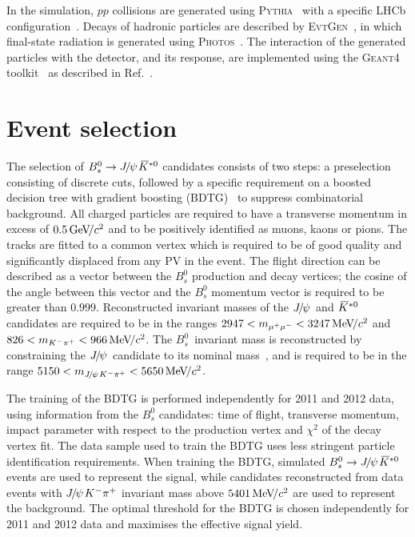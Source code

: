 \documentclass[12pt,a4paper]{article}
\def\photos     {\mbox{\textsc{Photos}}\xspace}
\def\pythia     {\mbox{\textsc{Pythia}}\xspace}
\def\evtgen     {\mbox{\textsc{EvtGen}}\xspace}
\def\geant      {\mbox{\textsc{Geant4}}\xspace}
\def\PJ      {\ensuremath{J}\xspace}
\def\lhcb {\mbox{LHCb}\xspace}
\def\Ppsi {\ensuremath{\psi}\xspace}
\def\jpsi     {{\ensuremath{{\PJ\mskip -3mu/\mskip -2mu\Ppsi\mskip 2mu}}}\xspace}
\def\Jpsi     {{\ensuremath{\jpsi}}\xspace}
\newcommand{\Bs}{\ensuremath{B^0_s}\xspace}
\newcommand{\BsJpsiKst}{\ensuremath{B^0_s\to \jpsi \Kstarzb}\xspace}
\def\Kbar  {\kern 0.2em\overline{\kern -0.2em K}{}\xspace}
\def\Kstarzb {\ensuremath{\Kbar^{*0}}\xspace}
\newcommand{\gevcc}{\ensuremath{{\mathrm{\,Ge\kern -0.1em V\!/}c^2}}\xspace}
\newcommand{\mevcc}{\ensuremath{{\mathrm{\,Me\kern -0.1em V\!/}c^2}}\xspace}
\begin{document}
  In the simulation, $pp$ collisions are generated using \pythia~\cite{Sjostrand:2006za,Sjostrand:2007gs}
  with a specific \lhcb configuration~\cite{LHCb-PROC-2010-056}.  Decays of hadronic particles
 are described by \evtgen~\cite{Lange:2001uf}, in which final-state
 radiation is generated using \photos~\cite{Golonka:2005pn}. The
 interaction of the generated particles with the detector, and its response,
 are implemented using the \geant toolkit~\cite{Allison:2006ve,  Agostinelli:2002hh} as described in
 Ref.~\cite{LHCb-PROC-2011-006}.

\section{Event selection}
\label{sec:selection}

The selection of \BsJpsiKst candidates consists of two steps: a preselection consisting of discrete cuts, followed by
a specific requirement on a boosted decision tree with gradient boosting (BDTG)~\cite{Breiman,AdaBoost} to suppress
combinatorial background. 
All charged particles are required to have a transverse momentum in excess of $0.5\gevcc$ and to be positively identified as
muons, kaons or pions. 
The tracks are fitted to a common vertex which is required to be of good quality and significantly displaced from any PV in the event. 
The flight direction can be described as a vector between the \Bs production and decay vertices; the cosine of the angle between this vector and the \Bs momentum vector is required to be greater than $0.999$. 
Reconstructed invariant masses of the \Jpsi and \Kstarzb candidates are required to be in the
ranges $2947 < m_{\mu^+\mu^-} < 3247 \mevcc$ and $826 < m_{K^-\pi^+} < 966 \mevcc$.
The \Bs\ invariant mass is reconstructed by constraining the \jpsi candidate to its nominal mass~\cite{PDG2014}, and is
required to be in the range $5150 < m_{\jpsi K^- \pi^+} < 5650 \mevcc$. 

The training of the BDTG is performed independently for 2011 and 2012 data, using information from the \Bs candidates: 
time of flight, transverse momentum, impact parameter with respect to the production vertex and $\chi^2$ of the
decay vertex fit.  
The data sample used to train the BDTG uses less stringent particle identification requirements. 
When training the BDTG, simulated \BsJpsiKst events are used to represent the signal, while candidates
reconstructed from data events with $\jpsi K^{-}\pi^{+}$ invariant mass above $5401 \mevcc$ are used to represent the background. The optimal threshold for the BDTG is chosen independently for 2011 and 2012 data and maximises the effective signal
yield. 
\end{document}
